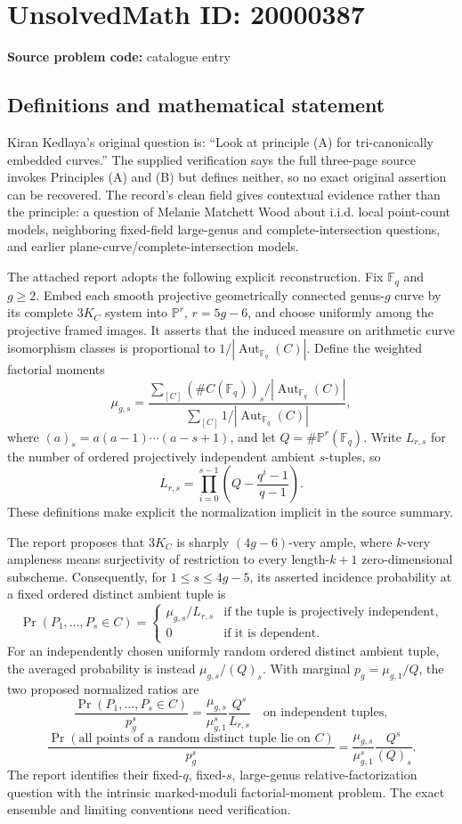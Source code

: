 \documentclass[11pt]{article}
\newcommand{\F}{\mathbb{F}}
\newcommand{\PP}{\mathbb{P}}
\begin{document}
\section*{UnsolvedMath ID: 20000387}
\textbf{Source problem code:} catalogue entry
\subsection{Definitions and mathematical statement}
Kiran Kedlaya's original question is: ``Look at principle (A) for tri-canonically embedded curves.'' The supplied verification says the full three-page source invokes Principles (A) and (B) but defines neither, so no exact original assertion can be recovered. The record's clean field gives contextual evidence rather than the principle: a question of Melanie Matchett Wood about i.i.d. local point-count models, neighboring fixed-field large-genus and complete-intersection questions, and earlier plane-curve/complete-intersection models.

The attached report adopts the following explicit reconstruction. Fix \(\F_q\) and \(g\geq2\). Embed each smooth projective geometrically connected genus-\(g\) curve by its complete \(3K_C\) system into \(\PP^r\), \(r=5g-6\), and choose uniformly among the projective framed images. It asserts that the induced measure on arithmetic curve isomorphism classes is proportional to \(1/|\operatorname{Aut}_{\F_q}(C)|\). Define the weighted factorial moments
\[
\mu_{g,s}=\frac{\sum_{[C]}(\#C(\F_q))_s/|\operatorname{Aut}_{\F_q}(C)|}
{\sum_{[C]}1/|\operatorname{Aut}_{\F_q}(C)|},
\]
where \((a)_s=a(a-1)\cdots(a-s+1)\), and let \(Q=\#\PP^r(\F_q)\). Write \(L_{r,s}\) for the number of ordered projectively independent ambient \(s\)-tuples, so
\[
L_{r,s}=\prod_{i=0}^{s-1}\left(Q-\frac{q^i-1}{q-1}\right).
\]
These definitions make explicit the normalization implicit in the source summary.

The report proposes that \(3K_C\) is sharply \((4g-6)\)-very ample, where \(k\)-very ampleness means surjectivity of restriction to every length-\(k+1\) zero-dimensional subscheme. Consequently, for \(1\leq s\leq4g-5\), its asserted incidence probability at a fixed ordered distinct ambient tuple is
\[
\Pr(P_1,\ldots,P_s\in C)=
\begin{cases}
\mu_{g,s}/L_{r,s}&\text{if the tuple is projectively independent},\\
0&\text{if it is dependent}.
\end{cases}
\]
For an independently chosen uniformly random ordered distinct ambient tuple, the averaged probability is instead \(\mu_{g,s}/(Q)_s\). With marginal \(p_g=\mu_{g,1}/Q\), the two proposed normalized ratios are
\[
\frac{\Pr(P_1,\ldots,P_s\in C)}{p_g^s}
=\frac{\mu_{g,s}}{\mu_{g,1}^s}\frac{Q^s}{L_{r,s}}
\quad\text{on independent tuples},
\]
\[
\frac{\Pr(\text{all points of a random distinct tuple lie on }C)}{p_g^s}
=\frac{\mu_{g,s}}{\mu_{g,1}^s}\frac{Q^s}{(Q)_s}.
\]
The report identifies their fixed-\(q\), fixed-\(s\), large-genus relative-factorization question with the intrinsic marked-moduli factorial-moment problem. The exact ensemble and limiting conventions need verification.
\end{document}
